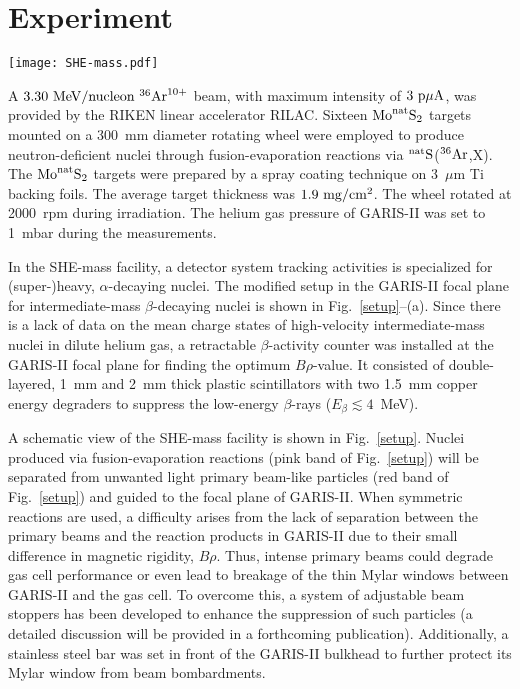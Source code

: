 \documentclass[3p]{elsarticle}
\begin{document}
\section{Experiment}

\begin{figure*}[!t]
  \centering
  \texttt{[image: SHE-mass.pdf]}
  \caption{Overview of the SHE-mass facility. (a) Details of gas-cell and top trap chambers. (b) Details of bottom trap chamber and MRTOF device. See texts for details. \label{setup}}
\end{figure*}

A $3.30 \ {\rm MeV/nucleon}  \ ^{36}{\rm Ar}^{10+}$ beam, with maximum intensity of $ 3 \ {\rm p \mu A}$, was provided by the RIKEN linear accelerator RILAC. Sixteen ${\rm Mo}^{\rm nat}{\rm S}_2$ targets mounted on a 300~mm diameter rotating wheel \citep{Kaji2015} were employed to produce neutron-deficient  nuclei through fusion-evaporation reactions via $^{\rm nat}{\rm S}$($^{36}{\rm Ar}$,X). The ${\rm Mo}^{\rm nat}{\rm S}_2$ targets were prepared by a spray coating technique \citep{Greene2002} on 3~$\mu$m Ti backing foils. The average target thickness was $1.9 \ {\rm mg/cm^2}$. The wheel rotated at 2000~rpm during irradiation. The helium gas pressure of GARIS-II was set to 1~mbar during the measurements.

In the SHE-mass facility, a detector system tracking activities is specialized for (super-)heavy, $\alpha$-decaying nuclei. The modified setup in the GARIS-II focal plane for intermediate-mass $\beta$-decaying nuclei is shown in Fig.~\ref{setup}--(a). Since there is a lack of data on the mean charge states of high-velocity intermediate-mass nuclei in dilute helium gas, a retractable $\beta$-activity counter was installed at the GARIS-II focal plane for finding the optimum $B\rho$-value. It consisted of double-layered, 1~mm and 2~mm thick plastic scintillators with two 1.5~mm copper energy degraders to suppress the low-energy $\beta$-rays ($E_{\beta} \lesssim 4$~MeV).

A schematic view of the SHE-mass facility is shown in Fig.~\ref{setup}. Nuclei produced via fusion-evaporation reactions (pink band of Fig.~\ref{setup}) will be separated from unwanted light primary beam-like particles (red band of Fig.~\ref{setup}) and  guided to the focal plane of GARIS-II. When symmetric reactions are used, a difficulty arises from the lack of separation between the primary beams and the reaction products in GARIS-II due to their small difference in magnetic rigidity, $B\rho$. Thus, intense primary beams could degrade gas cell performance or even lead to breakage of the thin Mylar windows between GARIS-II and the gas cell. To overcome this, a system of adjustable beam stoppers has been developed to enhance the suppression of such particles (a detailed discussion will be provided in a forthcoming publication).  Additionally, a stainless steel bar was set in front of the GARIS-II bulkhead to further protect its Mylar window from beam bombardments.
\end{document}
